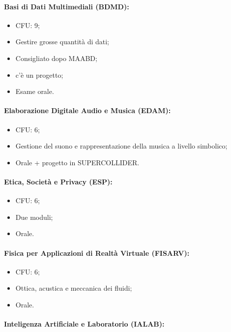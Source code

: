 \paragraph{Basi di Dati Multimediali (BDMD):}

\begin{itemize}
  \item CFU: 9;
  \item Gestire grosse quantità di dati;
  \item Consigliato dopo MAABD;
  \item c'è un progetto;
  \item Esame orale.
\end{itemize}

\paragraph{Elaborazione Digitale Audio e Musica (EDAM):}

\begin{itemize}
  \item CFU: 6;
  \item Gestione del suono e rappresentazione della musica a livello simbolico;
  \item Orale + progetto in SUPERCOLLIDER.
\end{itemize}

\paragraph{Etica, Società e Privacy (ESP):}

\begin{itemize}
  \item CFU: 6;
  \item Due moduli;
  \item Orale.
\end{itemize}

\paragraph{Fisica per Applicazioni di Realtà Virtuale (FISARV):}

\begin{itemize}
  \item CFU: 6;
  \item Ottica, acustica e meccanica dei fluidi;
  \item Orale.
\end{itemize}

\paragraph{Inteligenza Artificiale e Laboratorio (IALAB):}

